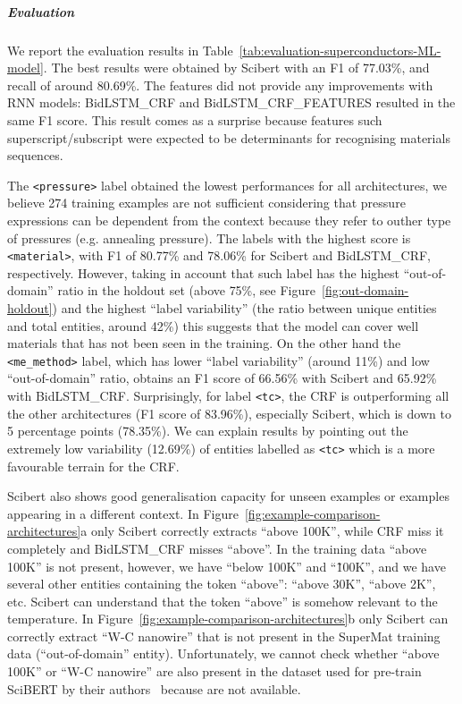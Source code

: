 \documentclass[]{interact}
\theoremstyle{plain}%
\theoremstyle{definition}
\theoremstyle{remark}
\begin{document}
\subparagraph*{Evaluation}

We report the evaluation results in Table~\ref{tab:evaluation-superconductors-ML-model}.
The best results were obtained by Scibert with an F1 of 77.03\%, and recall of around 80.69\%.
The features did not provide any improvements with RNN models: BidLSTM\_CRF and BidLSTM\_CRF\_FEATURES resulted in the same F1 score.
This result comes as a surprise because features such superscript/subscript were expected to be determinants for recognising materials sequences.

The \texttt{<pressure>} label obtained the lowest performances for all architectures, we believe 274 training examples are not sufficient considering that pressure expressions can be dependent from the context because they refer to outher type of pressures (e.g. annealing pressure).
The labels with the highest score is \texttt{<material>}, with F1 of 80.77\% and 78.06\% for Scibert and BidLSTM\_CRF, respectively. However, taking in account that such label has the highest ``out-of-domain'' ratio in the holdout set (above 75\%, see Figure~\ref{fig:out-domain-holdout}) and the highest ``label variability'' (the ratio between unique entities and total entities, around 42\%) this suggests that the model can cover well materials that has not been seen in the training.
On the other hand the \texttt{<me\_method>} label, which has lower ``label variability'' (around 11\%) and low ``out-of-domain'' ratio, obtains an F1 score of 66.56\% with Scibert and 65.92\% with BidLSTM\_CRF.
Surprisingly, for label \texttt{<tc>}, the CRF is outperforming all the other architectures (F1 score of 83.96\%), especially Scibert, which is down to 5 percentage points (78.35\%). We can explain results by pointing out the extremely low variability (12.69\%) of entities labelled as \texttt{<tc>} which is a more favourable terrain for the CRF. %

Scibert also shows good generalisation capacity for unseen examples or examples appearing in a different context.
In Figure~\ref{fig:example-comparison-architectures}a only Scibert correctly extracts ``above 100K'', while CRF miss it completely and BidLSTM\_CRF misses ``above''.
In the training data ``above 100K'' is not present, however, we have ``below 100K'' and ``\~100K'', and we have several other entities containing the token ``above'': ``above 30K'', ``above 2K'', etc.
Scibert can understand that the token ``above'' is somehow relevant to the temperature.
In Figure~\ref{fig:example-comparison-architectures}b only Scibert can correctly extract ``W-C nanowire'' that is not present in the SuperMat training data (``out-of-domain'' entity).
Unfortunately, we cannot check whether ``above 100K'' or ``W-C nanowire'' are also present in the dataset used for pre-train SciBERT by their authors~\cite{Beltagy2019SciBERT} because are not available.
\end{document}
